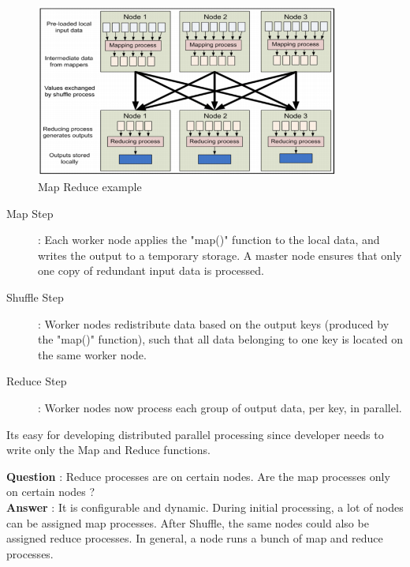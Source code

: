 \documentclass[twoside]{article}
\begin{document}
\begin{figure}[H]
\centering
\includegraphics[width=100mm]{map-reduce.png}
\caption{Map Reduce example\label{overflow}}
\end{figure}

\begin{description}
  \item[Map Step] : Each worker node applies the "map()" function to the local data, and writes the output to a temporary storage. A master node ensures that only one copy of redundant input data is processed.
  \item[Shuffle Step] :  Worker nodes redistribute data based on the output keys (produced by the "map()" function), such that all data belonging to one key is located on the same worker node.
  \item[Reduce Step] : Worker nodes now process each group of output data, per key, in parallel.
\end{description}

Its easy for developing distributed parallel processing since developer needs to write only the Map and Reduce functions.

\textbf{Question} : Reduce processes are on certain nodes. Are the map processes only on certain nodes ? \\
\textbf{Answer} : It is configurable and dynamic. During initial processing, a lot of nodes can be assigned map processes. After Shuffle, the same nodes could also be assigned reduce processes. In general, a node runs a bunch of map and reduce processes. 
\end{document}
